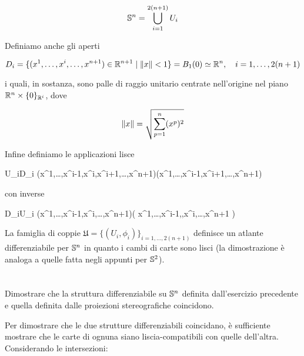 \begin{equation}
	\S^{n} = \bigcup_{i=1}^{2(n+1)} U_{i}
\end{equation}

Definiamo anche gli aperti

\begin{equation}
	D_{i} = \{ (x^{1},\dots,x^{i},\dots,x^{n+1}) \in \R^{n+1} \mid \norm{x} < 1 \} = B_{1}(0) \simeq \R^{n} \qcomma i = 1,\dots,2(n+1)
\end{equation}

i quali, in sostanza, sono palle di raggio unitario centrate nell'origine nel piano $ \R^{n} \times \{0\}_{\R^{i}} $, dove

\begin{equation}
	\norm{x} = \sqrt{ \sum_{p=1}^{n} (x^{p})^{2} }
\end{equation}

Infine definiamo le applicazioni lisce

%
	{U_{i}}{D_{i}}%
	{(x^{1},\dots,x^{i-1},x^{i},x^{i+1},\dots,x^{n+1})}{(x^{1},\dots,x^{i-1},x^{i+1},\dots,x^{n+1})}

con inverse

%
	{D_{i}}{U_{i}}%
	{(x^{1},\dots,x^{i-1},x^{i},\dots,x^{n+1})}{\left( x^{1},\dots,x^{i-1},,x^{i},\dots,x^{n+1} \right)}

La famiglia di coppie $ \mathfrak{U} = \{ (U_{i},\phi_{i}) \}_{i=1,\dots,2(n+1)} $ definisce un atlante differenziabile per $ \S^{n} $ in quanto i cambi di carte sono lisci (la dimostrazione è analoga a quelle fatta negli appunti per $ \S^{2} $).

\tocless\section{}\label{es2-2}

\begin{tcolorbox}
	Dimostrare che la struttura differenziabile su $ \S^{n} $ definita dall’esercizio precedente e quella definita dalle proiezioni
	stereografiche coincidono.
\end{tcolorbox}

Per dimostrare che le due strutture differenziabili coincidano, è sufficiente mostrare che le carte di ognuna siano liscia-compatibili con quelle dell'altra.\\
Considerando le intersezioni:

